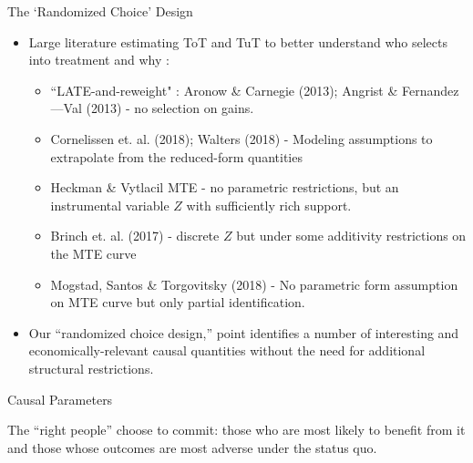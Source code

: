 \documentclass[8pt]{beamer}
\begin{document}
\begin{frame}{The `Randomized Choice' Design}
\label{rc_design}
\begin{itemize}
    \vfill \item  Large literature estimating ToT and TuT to better understand who selects  into  treatment  and  why : \begin{itemize}
        \item “LATE-and-reweight" : Aronow \& Carnegie (2013); Angrist \& Fernandez—Val (2013)  - no selection on gains.  
        \item Cornelissen et. al. (2018); Walters (2018)  - Modeling assumptions to extrapolate from the reduced-form quantities
        \item Heckman \& Vytlacil MTE - no parametric  restrictions,  but  an  instrumental  variable $Z$ with sufficiently rich support.
        \item Brinch et. al. (2017) - discrete $Z$ but under some additivity restrictions on the MTE curve
        \item Mogstad, Santos \& Torgovitsky (2018) - No parametric form assumption on MTE curve but only partial identification.
    \end{itemize}
    
    \vfill \item Our “randomized choice design,” point identifies a number of interesting and economically-relevant causal quantities  without  the  need  for  additional  structural  restrictions.  \hyperlink{identification_randomized_choice}{} %
    
\end{itemize}
\end{frame}


\begin{frame}{Causal Parameters}
\begin{table}[H]
\caption{Causal TE}
\label{tot_tut}
\begin{center}
\scriptsize{}
\end{center}
\end{table}

 The “right people” choose to commit:  those who are most likely to benefit from it and those whose outcomes are most adverse under the status quo.
\end{frame}
\end{document}
